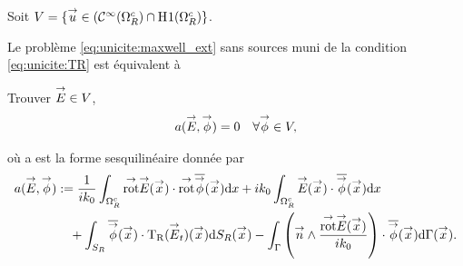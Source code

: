   Soit \(V = \lbrace \vect{u} \in (\mathcal{C}^\infty(\OO^c_R)\cap\Sobolev[1](\OO^c_R) \rbrace\).

  Le problème \eqref{eq:unicite:maxwell_ext} sans sources muni de la condition \eqref{eq:unicite:TR} est équivalent à
  \begin{prop}
    Trouver \(\vE \in V\),
    \begin{align*}
      a(\vE,\vect\phi) = 0 && \forall \vect \phi \in V,
    \end{align*}

    où a est la forme sesquilinéaire donnée par
    \begin{equation*}
      \begin{aligned}
      a(\vE,\vect\phi) &:=  \frac{1}{ik_0} \int_{\OO^c_R} \trot \vE(\vx) \cdot \trot \conj{\vect{\phi}}(\vx) \dd{x} + ik_0\int_{\OO^c_R}\vE(\vx)\cdot\conj{\vect{\phi}}(\vx) \dd{x}
        \\ 
        & \quad + \int_{S_R} \conj{ \vect \phi }(\vx) \cdot \Tr(\vE_t)(\vx) \dd{S_R}(\vx) - \int_\Gamma \left(\vn \pvect \frac{\trot \vE(\vx)}{ik_0}\right) \cdot \conj{\vect \phi} (\vx) \dd{\Gamma}(\vx).
      \end{aligned}
    \end{equation*}
  \end{prop}

